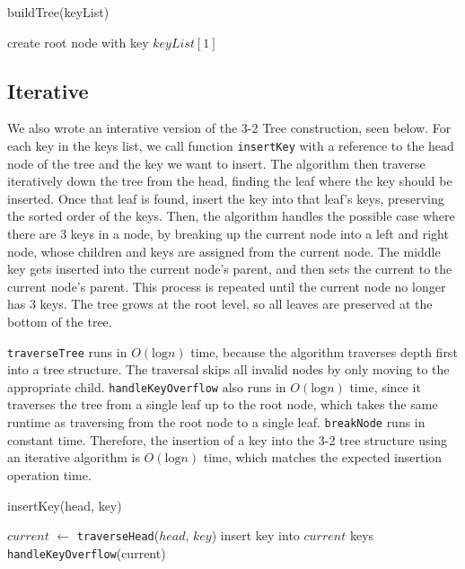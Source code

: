 \documentclass{article}
\begin{document}
        \begin{function}
            \caption{buildTree(keyList)}
            \DontPrintSemicolon


            create root node with key $keyList[1]$\;

        \end{function}

    \subsection*{Iterative}

We also wrote an interative version of the 3-2 Tree construction, seen below. For each key in the keys list, we call function \texttt{insertKey} with a reference to the head node of the tree and the key we want to insert. The algorithm then traverse iteratively down the tree from the head, finding the leaf where the key should be inserted. Once that leaf is found, insert the key into that leaf's keys, preserving the sorted order of the keys. Then, the algorithm handles the possible case where there are 3 keys in a node, by breaking up the current node into a left and right node, whose children and keys are assigned from the current node. The middle key gets inserted into the current node's parent, and then sets the current to the current node's parent. This process is repeated until the current node no longer has 3 keys. The tree grows at the root level, so all leaves are preserved at the bottom of the tree.

\texttt{traverseTree} runs in $O(\text{log}n)$ time, because the algorithm traverses depth first into a tree structure. The traversal skips all invalid nodes by only moving to the appropriate child. \texttt{handleKeyOverflow} also runs in $O(\text{log}n)$ time, since it traverses the tree from a single leaf up to the root node, which takes the same runtime as traversing from the root node to a single leaf. \texttt{breakNode} runs in constant time. Therefore, the insertion of a key into the 3-2 tree structure using an iterative algorithm is $O(\text{log}n)$ time, which matches the expected insertion operation time.

\begin{function}
	\caption{insertKey(head, key)}
	\DontPrintSemicolon
	$current$ $\gets$ \texttt{traverseHead}($head$, $key$)\;
	insert key into $current$ keys\;
	\texttt{handleKeyOverflow}(current)\;
\end{function}
\end{document}
